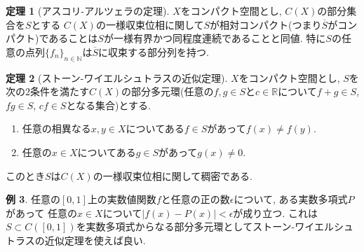 \documentclass[dvipdfmx,a4paper,11pt]{article}
\newcommand{\R}{\mathbb{R}}
\newcommand{\N}{\mathbb{N}}
\theoremstyle{definition}
\newtheorem{thm}{定理}
\newtheorem{dfn}[thm]{定義}
\newtheorem{exa}[thm]{例}
\begin{document}
   \begin{tcolorbox}[
    colback = white,
    colframe = green!35!black,
    fonttitle = \bfseries,
    breakable = true]
    \begin{thm}[アスコリ-アルツェラの定理]
  $X$をコンパクト空間とし, $C(X)$の部分集合を$S$とする
 $C(X)$の一様収束位相に関して$S$が相対コンパクト(つまり$\overline{S}$がコンパクト)であることは$S$が一様有界かつ同程度連続であることと同値. 特に$S$の任意の点列$\{ f_n\}_{n \in \N}$は$\overline{S}$に収束する部分列を持つ.
  \end{thm}
  \end{tcolorbox}
  
  \begin{comment}
    \begin{tcolorbox}[
    colback = white,
    colframe = green!35!black,
    fonttitle = \bfseries,
    breakable = true]
    \begin{dfn}
  $X$をコンパクト空間とし, $C(X)$の部分集合を$S$とする
$S$が$C(X)$の\underline{部分多元環}とは任意の$f,g \in S$と$c \in \R$について$f+g \in S$, $fg \in S$, $cf \in S$となること.
  \end{dfn}
  \end{tcolorbox}
  \end{comment}
  
     \begin{tcolorbox}[
    colback = white,
    colframe = green!35!black,
    fonttitle = \bfseries,
    breakable = true]
    \begin{thm}[ストーン-ワイエルシュトラスの近似定理]
  $X$をコンパクト空間とし, $S$を次の2条件を満たす$C(X)$の部分多元環(任意の$f,g \in S$と$c \in \R$について$f+g \in S$, $fg \in S$, $cf \in S$となる集合)とする.
  \begin{enumerate}
   \setlength{\parskip}{0cm} 
  \setlength{\itemsep}{0cm} 
  \item 任意の相異なる$x,y \in X$についてある$f \in S$があって$f(x) \neq f(y)$.
  \item 任意の$x \in X$についてある$g \in S$があって$g(x) \neq 0$.
  \end{enumerate}
このとき$S$は$C(X)$の一様収束位相に関して稠密である.
  \end{thm}
  \end{tcolorbox}
  \begin{exa}
  任意の$[0,1]$上の実数値関数$f$と任意の正の数$\epsilon$について, ある実数多項式$P$があって
  任意の$x \in X$について$|f(x) - P(x)| < \epsilon$が成り立つ. これは$S \subset C([0,1])$を実数多項式からなる部分多元環としてストーン-ワイエルシュトラスの近似定理を使えば良い.
  \end{exa}
  
\end{document}
